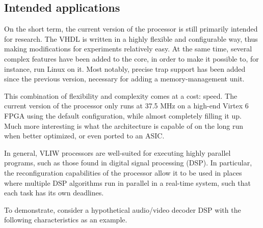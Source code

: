 \subsection{Intended applications}
\label{sec:core-ug-intro-applic}

On the short term, the current version of the \rvex{} processor is still
primarily intended for research. The VHDL is written in a highly flexible and
configurable way, thus making modifications for experiments relatively easy. At
the same time, several complex features have been added to the core, in order to
make it possible to, for instance, run Linux on it. Most notably, precise trap
support has been added since the previous \rvex{} version, necessary for adding
a memory-management unit.

This combination of flexibility and complexity comes at a cost: speed. The 
current version of the \rvex{} processor only runs at 37.5 MHz on a high-end 
Virtex 6 FPGA using the default configuration, while almost completely filling 
it up. Much more interesting is what the \rvex{} architecture is capable of on 
the long run when better optimized, or even ported to an ASIC.

In general, VLIW processors are well-suited for executing highly parallel 
programs, such as those found in digital signal processing (DSP). In particular, 
the reconfiguration capabilities of the \rvex{} processor allow it to be used in 
places where multiple DSP algorithms run in parallel in a real-time system, such 
that each task has its own deadlines.

To demonstrate, consider a hypothetical audio/video decoder DSP with the
following characteristics as an example.

